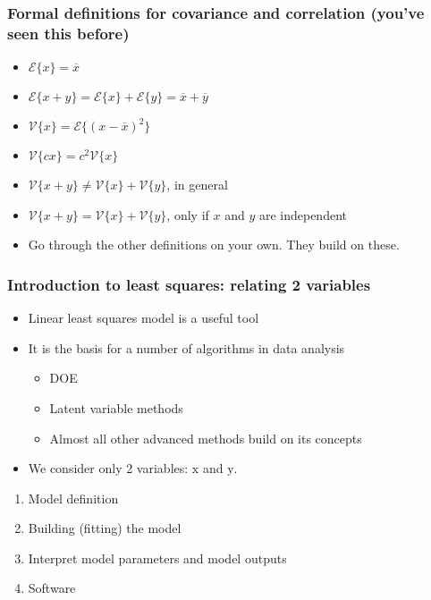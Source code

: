 \begin{frame}\frametitle{Formal definitions for covariance and correlation {\small (you've seen this before)}}
	\begin{itemize}
		\item	$\mathcal{E}\{x\} = \overline{x}$
		\item	$\mathcal{E}\{x+y\} = \mathcal{E}\{x\} + \mathcal{E}\{y\} = \overline{x} + \overline{y}$
		\item	$\mathcal{V}\{x\} = \mathcal{E}\{(x-\overline{x})^2\}$
		\item	$\mathcal{V}\{cx\} = c^2\mathcal{V}\{x\}$
		\item	$\mathcal{V}\{x+y\} \neq \mathcal{V}\{x\} + \mathcal{V}\{y\}$, in general
		\item	$\mathcal{V}\{x+y\} = \mathcal{V}\{x\} + \mathcal{V}\{y\}$, only if $x$ and $y$ are independent
		\item	Go through the other definitions on your own. They build on these.
	\end{itemize}
\end{frame}

\begin{frame}\frametitle{Introduction to least squares: relating 2 variables}
	\begin{itemize}
		\item	Linear least squares model is a useful tool
		\item	It is the basis for a number of algorithms in data analysis
		\begin{itemize}
			\item	DOE
			\item	Latent variable methods
			\item	Almost all other advanced methods build on its concepts
		\end{itemize}
	\end{itemize}
	\begin{itemize}
		\item	We consider only 2 variables: $\mathrm{x}$ and $\mathrm{y}$.
	\end{itemize}
	\begin{enumerate}
		\item	Model definition
		\item	Building (fitting) the model
		\item	Interpret model parameters and model outputs
		\item	Software
	\end{enumerate}
\end{frame}

